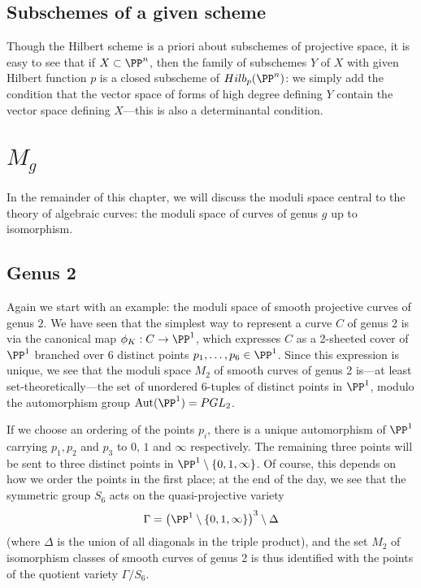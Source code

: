\subsection{Subschemes of a given scheme}

Though the Hilbert scheme is a priori about subschemes of projective space, it is easy to see that if $X\subset \PP^n$,
then the family of subschemes $Y$ of $X$ with given Hilbert function $p$ is a closed subscheme of $Hilb_p(\PP^n)$: we simply
add the condition that the vector space of forms of high degree defining $Y$  contain the vector space defining $X$---this is also a determinantal condition.

\section{$M_g$}

In the remainder of this chapter, we will discuss the moduli space central to the theory of algebraic curves: the moduli space of curves of genus $g$ up to isomorphism.

\subsection{Genus 2}                                                                                             

Again we start with an example: the moduli space of smooth projective curves of genus $2$. We have seen that the simplest way to represent a curve $C$ of genus 2 is via the canonical map $\phi_K : C \to \PP^1$, which expresses $C$ as a 2-sheeted cover of $\PP^1$ branched over 6 distinct points $p_1,\dots,p_6 \in \PP^1$. Since this expression is unique, we see that the moduli space $M_2$ of smooth curves of genus 2 is---at least set-theoretically---the set of unordered 6-tuples of distinct points in $\PP^1$, modulo the automorphism group ${\rm Aut}(\PP^1) = PGL_2$.

 If we choose an ordering of the points $p_i$, there is a unique automorphism of $\PP^1$ carrying $p_1, p_2$ and $p_3$ to $0$, $1$ and $\infty$ respectively.  The remaining three points will be sent to three distinct points in $\PP^1 \setminus \{0, 1, \infty \} $. Of course, this depends on how we order the points in the first place; at the end of the day, we see that the symmetric group $S_6$ acts on the quasi-projective variety
$$
\Gamma = \left( \PP^1 \setminus \{0, 1, \infty \} \right)^3 \setminus \Delta
$$
(where $\Delta$ is the union of all diagonals in the triple product), and the set $M_2$ of isomorphism classes of smooth curves of genus 2 is thus identified with the points of the quotient variety $\Gamma/S_6$.

